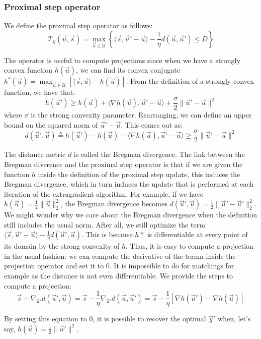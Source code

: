 \subsubsection{Proximal step operator}
We define the proximal step operator as follows:
\begin{equation}
  \mathcal{T}_{\eta}(\vec u, \vec s) = \max_{\vec u \in \mathcal{U}} \left \{
\langle \vec s, \vec u' - \vec u \rangle - \frac{1}{\eta} d(\vec u, \vec u')
\leq D \right \}
\end{equation}

The operator is useful to compute projections since when we have a strongly
convex function $h(\vec u)$, we can find its convex conjugate $h^*(\vec u) =
\max_{\vec u \in \mathcal{U}} \left [ \langle \vec s, \vec u \rangle - h(\vec u)
\right ]$. From the definition of a strongly convex function, we have that:
\begin{equation}
  h(\vec u') \geq h(\vec u) + \langle \nabla h(\vec u), \vec u' - \vec u \rangle
+ \frac{\sigma}{2} \lVert \vec u' - \vec u \rVert^2
\end{equation}
where $\sigma$ is the strong convexity parameter. Rearranging, we can define an
upper bound on the squared norm of $\vec u' - \vec u$. This comes out as:
\begin{equation}
  d(\vec u', \vec u) \triangleq h(\vec u') - h(\vec u) - \langle \nabla h(\vec u), \vec u' - \vec u \rangle \geq \frac{\sigma}{2} \lVert \vec u' - \vec u \rVert^2
\end{equation}

The distance metric $d$ is called the Bregman divergence. The link between the
Bregman diverence and the proximal step operator is that if we are given the
function $h$ inside the definition of the proximal step update, this induces the
Bregman divergence, which in turn induces the update that is performed at each
iteration of the extragradient algorithm. For example, if we have $h(\vec u) =
\frac{1}{2} \lVert \vec u \rVert_2^2 $, the Bregman divergence becomes $d(\vec
u', \vec u) = \frac{1}{2} \lVert \vec u' - \vec u' \rVert_2^2$. We might wonder
why we care about the Bregman divergence when the definition still includes the
usual norm. After all, we still optimize the term $\langle \vec s, \vec u' -
\vec u \rangle - \frac{1}{\eta} d(\vec u', \vec u)$. This is because $h*$ is
differentiable at every point of its domain by the strong convexity of $h$.
Thus, it is easy to compute a projection in the usual fashion: we can compute
the derivative of the termn inside the projection operator and set it to 0. It
is impossible to do for matchings for example as the distance is not even
differentiable. We provide the steps to compute a projection:
\begin{equation}
  \vec s - \nabla_{\vec u'} d(\vec u', \vec u) = \vec s - \frac{1}{\eta}
\nabla_{\vec u'} d(\vec u, \vec u') = \vec s - \frac{1}{\eta} \left [\nabla
h(\vec u') - \nabla h(\vec u) \right]
\end{equation}

By setting this equation to 0, it is possible to recover the optimal $\vec y'$
when, let's say, $h(\vec u) = \frac{1}{2} \lVert \vec u' \rVert^2$.

